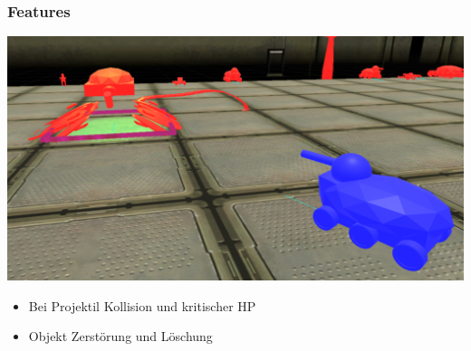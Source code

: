 ﻿\documentclass{beamer}
\begin{document}
\begin{frame} %
  \frametitle{Features} %
  
	\begin{minipage}[]{0.45\textwidth}
		\includegraphics[width=\textwidth]{Abbildungen/Destruction.PNG}
	\end{minipage}
	\begin{minipage}[]{0.45\textwidth}
		\begin{itemize}
			\item Bei Projektil Kollision und kritischer HP
			\item Objekt Zerstörung und Löschung
		\end{itemize}
	\end{minipage}
	
\end{frame}
\end{document}

